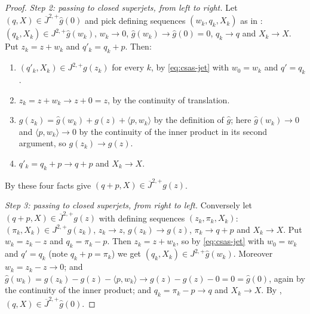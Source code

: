 \begin{proof}
\emph{Step 2: passing to closed superjets, from left to right.}
Let $(q,X)\in\overline J^{2,+}\widehat g(0)$ and pick defining sequences
$(w_k,q_k,X_k)$ as in : $(q_k,X_k)\in
J^{2,+}\widehat g(w_k)$, $w_k\to0$, $\widehat g(w_k)\to\widehat g(0)=0$,
$q_k\to q$ and $X_k\to X$. Put $z_k=z+w_k$ and $q'_k=q_k+p$. Then:
\begin{enumerate}
\item[(i)] $(q'_k,X_k)\in J^{2,+}g(z_k)$ for every $k$, by \eqref{eq:csas-jet}
with $w_0=w_k$ and $q'=q_k$.
\item[(ii)] $z_k=z+w_k\to z+0=z$, by the continuity of translation.
\item[(iii)] $g(z_k)=\widehat g(w_k)+g(z)+\langle p,w_k\rangle$ by the
definition of $\widehat g$; here $\widehat g(w_k)\to0$ and
$\langle p,w_k\rangle\to0$ by the continuity of the inner product in its second
argument, so $g(z_k)\to g(z)$.
\item[(iv)] $q'_k=q_k+p\to q+p$ and $X_k\to X$.
\end{enumerate}
By  these four facts give
$(q+p,X)\in\overline J^{2,+}g(z)$.

\emph{Step 3: passing to closed superjets, from right to left.}
Conversely let $(q+p,X)\in\overline J^{2,+}g(z)$ with defining sequences
$(z_k,\pi_k,X_k)$: $(\pi_k,X_k)\in J^{2,+}g(z_k)$, $z_k\to z$, $g(z_k)\to g(z)$,
$\pi_k\to q+p$ and $X_k\to X$. Put $w_k=z_k-z$ and $q_k=\pi_k-p$. Then
$z_k=z+w_k$, so by \eqref{eq:csas-jet} with $w_0=w_k$ and $q'=q_k$ (note
$q_k+p=\pi_k$) we get $(q_k,X_k)\in J^{2,+}\widehat g(w_k)$. Moreover
$w_k=z_k-z\to0$; and
$\widehat g(w_k)=g(z_k)-g(z)-\langle p,w_k\rangle\to g(z)-g(z)-0=0
=\widehat g(0)$, again by the continuity of the inner product; and
$q_k=\pi_k-p\to q$ and $X_k\to X$. By ,
$(q,X)\in\overline J^{2,+}\widehat g(0)$.
\end{proof}
